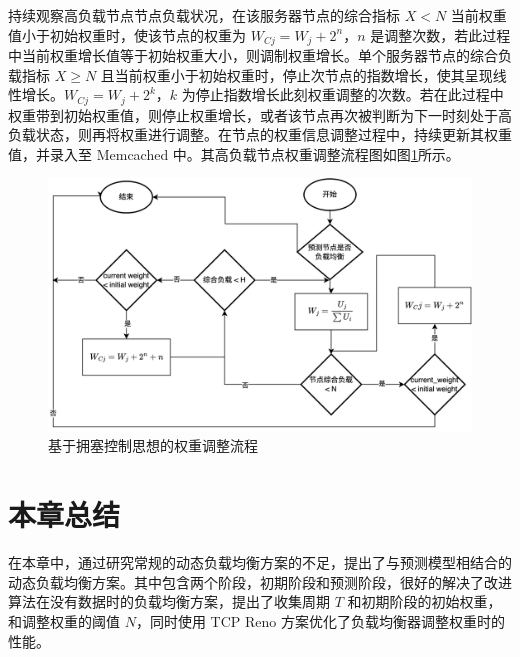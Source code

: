 持续观察高负载节点节点负载状况，在该服务器节点的综合指标 $X < N$ 当前权重值小于初始权重时，使该节点的权重为 $W_{Cj} = W_j + 2^n$，$n$ 是调整次数，若此过程中当前权重增长值等于初始权重大小，则调制权重增长。单个服务器节点的综合负载指标 $X \ge N$ 且当前权重小于初始权重时，停止次节点的指数增长，使其呈现线性增长。$W_{Cj} = W_j + 2^k$，$k$ 为停止指数增长此刻权重调整的次数。若在此过程中权重带到初始权重值，则停止权重增长，或者该节点再次被判断为下一时刻处于高负载状态，则再将权重进行调整。在节点的权重信息调整过程中，持续更新其权重值，并录入至 Memcached 中。其高负载节点权重调整流程图如图\ref{contral_weight}所示。

\begin{figure}[htbp]
  \centering
  \includegraphics[width=.9\textwidth]{figures/change_weight.png}
  \caption{基于拥塞控制思想的权重调整流程}
  \label{contral_weight}
\end{figure}

\section{本章总结}
在本章中，通过研究常规的动态负载均衡方案的不足，提出了与预测模型相结合的动态负载均衡方案。其中包含两个阶段，初期阶段和预测阶段，很好的解决了改进算法在没有数据时的负载均衡方案，提出了收集周期 $T$ 和初期阶段的初始权重，和调整权重的阈值 $N$，同时使用 TCP Reno 方案优化了负载均衡器调整权重时的性能。
